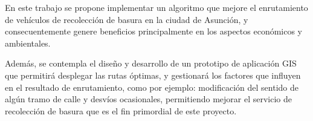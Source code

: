 \begin{resumen}
En este trabajo se propone implementar un algoritmo que mejore el enrutamiento de vehículos de recolección de basura en la ciudad de Asunción, y consecuentemente genere beneficios principalmente en los aspectos económicos y ambientales.

Además, se contempla el diseño y desarrollo de un prototipo de aplicación GIS que permitirá desplegar las rutas óptimas, y gestionará los factores que influyen en el resultado de enrutamiento, como por ejemplo: modificación del sentido de algún tramo de calle y desvíos ocasionales, permitiendo mejorar el servicio de recolección de basura que es el fin primordial de este proyecto.
\end{resumen}